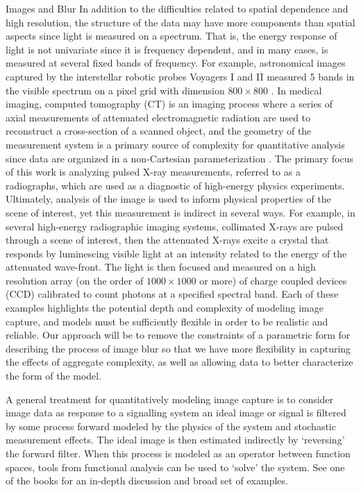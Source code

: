 \begin{chapter}{Images and Blur}
  In addition to the difficulties related to spatial dependence and high resolution, the structure of the data may have more components than spatial aspects since light is measured on a spectrum.
  That is, the energy response of light is not univariate since it is frequency dependent, and in many cases, is measured at several fixed bands of frequency.
  For example, astronomical images captured by the interstellar robotic probes Voyagers I and II measured 5 bands in the visible spectrum on a pixel grid with dimension $800 \times 800$ \citep{voyager}.
  In medical imaging, computed tomography (CT) is an imaging process where a series of axial measurements of attenuated electromagnetic radiation are used to reconstruct a cross-section of a scanned object, and the geometry of the measurement system is a primary source of complexity for quantitative analysis since data are organized in a non-Cartesian parameterization \citep{epstein2008}.
  The primary focus of this work is analyzing pulsed X-ray measurements, referred to as a radiographs, which are used as a diagnostic of high-energy physics experiments.  
  Ultimately, analysis of the image is used to inform physical properties of the scene of interest, yet this measurement is indirect in several ways. 
  For example, in several high-energy radiographic imaging systems, collimated X-rays are pulsed through a scene of interest, then the attenuated X-rays excite a crystal that responds by luminescing visible light at an intensity related to the energy of the attenuated wave-front.  
  The light is then focused and measured on a high resolution array (on the order of $1000\times1000$ or more) of charge coupled devices (CCD) calibrated to count photons at a specified spectral band.
  Each of these examples highlights the potential depth and complexity of modeling image capture, and models must be sufficiently flexible in order to be realistic and reliable.
  Our approach will be to remove the constraints of a parametric form for describing the process of image blur so that we have more flexibility in capturing the effects of aggregate complexity, as well as allowing data to better characterize the form of the model. 

A general treatment for quantitatively modeling image capture is to consider image data as response to a signalling system an ideal image or signal is filtered by some process forward modeled by the physics of the system and stochastic measurement effects. %
The ideal image is then estimated indirectly by `reversing' the forward filter. 
When this process is modeled as an operator between function spaces, tools from functional analysis can be used to `solve' the system.
See one of the books \citep{vogel2002,epstein2008} for an in-depth discussion and broad set of examples.


\end{chapter}

